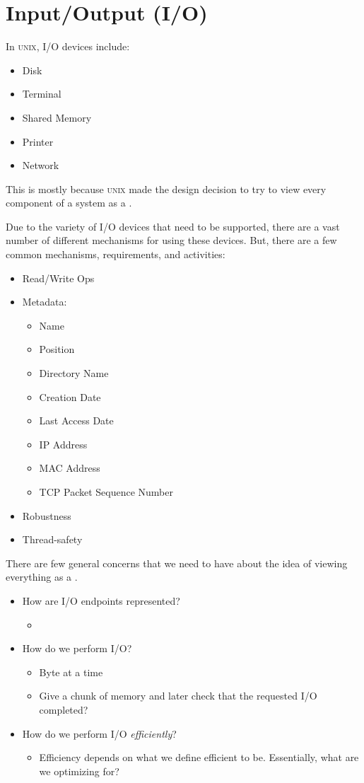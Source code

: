 \section{Input/Output (I/O)}\label{sec:IO}
In \textsc{unix}, I/O devices include:
\begin{itemize}[noitemsep]
\item Disk
\item Terminal
\item Shared Memory
\item Printer
\item Network
\end{itemize}

This is mostly because \textsc{unix} made the design decision to try to view every component of a system as a .

Due to the variety of I/O devices that need to be supported, there are a vast number of different mechanisms for using these devices.
But, there are a few common mechanisms, requirements, and activities:
\begin{itemize}[noitemsep]
\item Read/Write Ops
\item Metadata:
  \begin{itemize}[noitemsep]
  \item Name
  \item Position
  \item Directory Name
  \item Creation Date
  \item Last Access Date
  \item IP Address
  \item MAC Address
  \item TCP Packet Sequence Number
  \end{itemize}
\item Robustness
\item Thread-safety
\end{itemize}

There are few general concerns that we need to have about the idea of viewing everything as a .
\begin{itemize}[noitemsep]
\item How are I/O endpoints represented?
  \begin{itemize}[noitemsep]
  \item {}
  \end{itemize}
\item How do we perform I/O?\@
  \begin{itemize}[noitemsep]
  \item Byte at a time
  \item Give a chunk of memory and later check that the requested I/O completed?
  \end{itemize}
\item How do we perform I/O \emph{efficiently}?
  \begin{itemize}[noitemsep]
  \item Efficiency depends on what we define efficient to be. Essentially, what are we optimizing for?
  \end{itemize}
\end{itemize}


